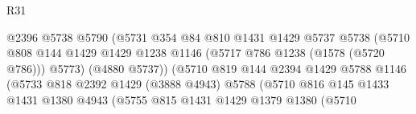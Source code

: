 \begin{lexlean}{R31}
\begin{coremodule}
                                            @2396
                                            @5738
                                            @5790
                                            (@5731
                                              @354
                                              @84
                                              @810
                                              @1431
                                              @1429
                                              @5737
                                              @5738
                                              (@5710
                                                @808
                                                @144
                                                @1429
                                                @1429
                                                @1238
                                                @1146
                                                (@5717 @786 @1238 (@1578 (@5720 @786)))
                                                @5773)
                                              (@4880 @5737))
                                            (@5710
                                              @819
                                              @144
                                              @2394
                                              @1429
                                              @5788
                                              @1146
                                              (@5733
                                                @818
                                                @2392
                                                @1429
                                                (@3888 @4943)
                                                @5788
                                                (@5710
                                                  @816
                                                  @145
                                                  @1433
                                                  @1431
                                                  @1380
                                                  @4943
                                                  (@5755
                                                    @815
                                                    @1431
                                                    @1429
                                                    @1379
                                                    @1380
                                                    (@5710

\end{coremodule}
\end{lexlean}
